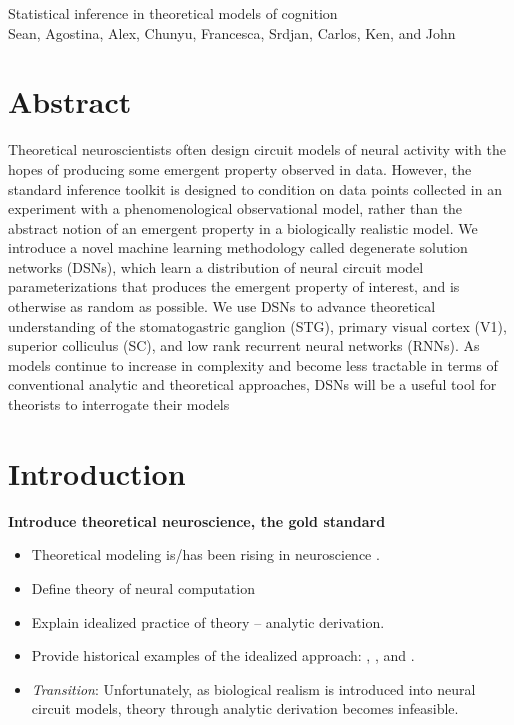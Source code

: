 \documentclass[11pt]{article}
\begin{document}
\medskip                        %

\thispagestyle{plain}
{\Large Statistical inference in theoretical models of cognition} \\
Sean, Agostina, Alex, Chunyu, Francesca, Srdjan, Carlos, Ken, and John
\section{Abstract}
Theoretical neuroscientists often design circuit models of neural activity with the hopes of producing some emergent property observed in data.  However, the standard inference toolkit is designed to condition on data points collected in an experiment with a phenomenological observational model, rather than the abstract notion of an emergent property in a biologically realistic model.  We introduce a novel machine learning methodology called degenerate solution networks (DSNs), which learn a distribution of neural circuit model parameterizations that produces the emergent property of interest, and is otherwise as random as possible.  We use DSNs to advance theoretical understanding of the stomatogastric ganglion (STG), primary visual cortex (V1), superior colliculus (SC), and low rank recurrent neural networks (RNNs).  As models continue to increase in complexity and become less tractable in terms of conventional analytic and theoretical approaches, DSNs will be a useful tool for theorists to interrogate their models

\section{Introduction}
\textbf{Introduce theoretical neuroscience, the gold standard}
\begin{itemize}
\item Theoretical modeling is/has been rising in neuroscience \cite{abbott2008theoretical}. 
\item Define theory of neural computation   
\item Explain idealized practice of theory -- analytic derivation.
\item Provide historical examples of the idealized approach: \cite{hopfield1984neurons}, \cite{sompolinsky1988chaos}, and  \cite{tsodyks1997paradoxical}.  
\item \textit{Transition}: Unfortunately, as biological realism is introduced into neural circuit models, theory through analytic derivation becomes infeasible.
\end{itemize}
\end{document}
